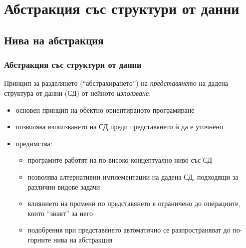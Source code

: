\documentclass{beamer}
\begin{document}
\section{Абстракция със структури от данни}

\subsection{Нива на абстракция}

\begin{frame}[<+->]
  \frametitle{Абстракция със структури от данни}

  \begin{definition}[Абстракция]
    Принцип за разделянето (``абстрахирането'') на \emph{представянето} на дадена структура от данни (СД) от нейното \emph{използване}.
  \end{definition}
  \begin{itemize}
  \item основен принцип на обектно-ориентираното програмиране
  \item позволява използването на СД преди представянето ѝ да е уточнено
  \item предимства:
    \begin{itemize}
    \item програмите работят на по-високо концептуално ниво със СД
    \item позволява алтернативни имплементации на дадена СД, подходящи за различни видове задачи
    \item влиянието на промени по представянето е ограничено до операциите, които ``знаят'' за него
    \item подобрения при представянето автоматично се разпространяват до по-горните нива на абстракция
    \end{itemize}
  \end{itemize}
\end{frame}
\end{document}
